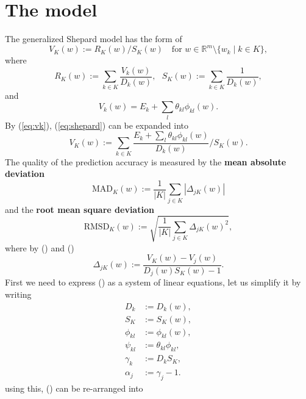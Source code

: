 \documentclass[12pt]{article}
\def\D{\displaystyle}
\begin{document}
\section{The model}
The generalized Shepard model has the form of 
\begin{equation}
	\label{eq:shepard}
	V_K(w):=R_K(w)/S_K(w) ~~~ \text{ for } w \in \mathbb{R}^m \setminus \{w_k\mid k\in K \},
\end{equation}
where
\begin{equation}
	R_K(w):=\sum_{k\in K} \frac{V_k(w)}{D_k(w)},~~~
	S_K(w):=\sum_{k\in K} \frac{1}{D_k(w)},
\end{equation}
and
\begin{equation}
	\label{eq:vk}
	V_k(w) = E_k + \sum_l \theta_{kl} \phi_{kl}(w).
\end{equation}
By (\ref{eq:vk}), (\ref{eq:shepard}) can be expanded into
\begin{equation}
	\label{eq:vk_expand}
	V_K(w) := \sum_{k\in K} \frac{E_k + \sum_l \theta_{kl} \phi_{kl}(w)}{D_k(w)} / S_K(w). 
\end{equation}
The quality of the prediction accuracy is measured by the \textbf{mean absolute deviation}
\begin{equation}
	\text{MAD}_K(w) := \frac{1}{|K|}\sum_{j\in K}|\Delta_{jK}(w)|
\end{equation}
and the \textbf{root mean square deviation}
\begin{equation}
	\text{RMSD}_K(w) := \sqrt{\frac{1}{|K|}\sum_{j\in K}\Delta_{jK}(w)^2},
\end{equation}
where by () and ()
\begin{equation}
	\label{eq:delta}
	\Delta_{jK}(w):=\D\frac{V_K(w)-V_j(w)}{D_j(w)S_K(w)-1}.
\end{equation}
First we need to express () as a system of linear equations, let us simplify it by writing
\begin{equation*}
	\label{eq:simp}
	\begin{split}
		D_k &:= D_k(w), \\
		S_K &:= S_K(w), \\
		\phi_{kl} &:= \phi_{kl}(w),\\
		\psi_{kl} &:= \theta_{kl}\phi_{kl}, \\
		\gamma_k &:= D_kS_K, \\
		\alpha_j &:= \gamma_j-1.
	\end{split}
\end{equation*}
using this, () can be re-arranged into
\end{document}
